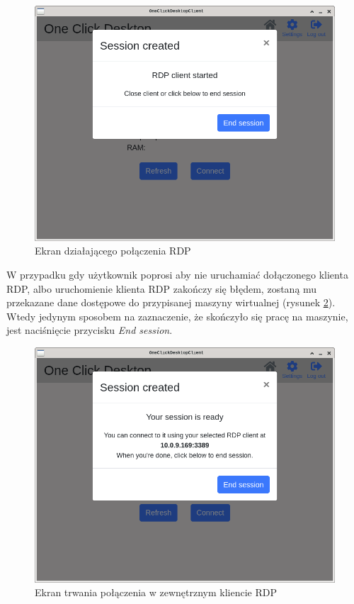\documentclass[../opis-rozwiazania.tex]{subfiles}
\begin{document}
\begin{figure}[ht!]
  \centering
  \includegraphics[width=\textwidth]{resources/client_session.png}
  \caption{Ekran działającego połączenia RDP}
  \label{figure:system_interaction.client.session}
\end{figure}

W przypadku gdy użytkownik poprosi aby nie uruchamiać dołączonego klienta RDP, albo uruchomienie klienta RDP zakończy się błędem, zostaną mu przekazane dane dostępowe do przypisanej maszyny wirtualnej (rysunek \ref{figure:system_interaction.client.session_nordp}).
Wtedy jedynym sposobem na zaznaczenie, że skończyło się pracę na maszynie, jest naciśnięcie przycisku \textit{End session}.

\begin{figure}[ht!]
  \centering
  \includegraphics[width=\textwidth]{resources/client_session_nordp.png}
  \caption{Ekran trwania połączenia w zewnętrznym kliencie RDP}
  \label{figure:system_interaction.client.session_nordp}
\end{figure}
\end{document}
